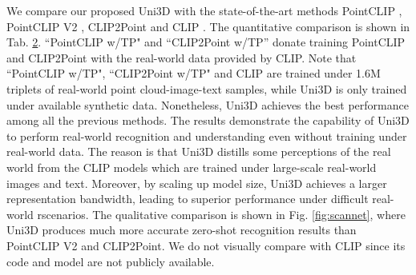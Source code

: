 \documentclass{article} \usepackage{iclr2024_conference,times}
\def\Ours{Uni3D\xspace}
\begin{document}
We compare our proposed \Ours with the state-of-the-art methods PointCLIP \citep{zhang2022pointclip}, PointCLIP V2 \citep{zhu2022pointclipv2}, CLIP2Point \citep{huang2022clip2point} and CLIP \citep{zeng2023clip2}. The quantitative comparison is shown in Tab. \hyperref[tab:scannet]{2}. ``PointCLIP w/TP" and ``CLIP2Point w/TP'' donate training PointCLIP and CLIP2Point with the real-world data provided by CLIP. Note that ``PointCLIP w/TP", ``CLIP2Point w/TP" and CLIP are trained under 1.6M triplets of real-world point cloud-image-text samples, while \Ours is only trained under available synthetic data. Nonetheless, \Ours achieves the best performance among all the previous methods. The results demonstrate the capability of \Ours to perform real-world recognition and understanding even without training under real-world data. The reason is that \Ours distills some perceptions of the real world from the CLIP models which are trained under large-scale real-world images and text. Moreover, by scaling up model size, \Ours achieves a larger representation bandwidth, leading to superior performance under difficult real-world rscenarios. The qualitative comparison is shown in Fig. \ref{fig:scannet}, where \Ours produces much more accurate zero-shot recognition results than PointCLIP V2 and CLIP2Point. We do not visually compare with CLIP since its code and model are not publicly available.
\end{document}
